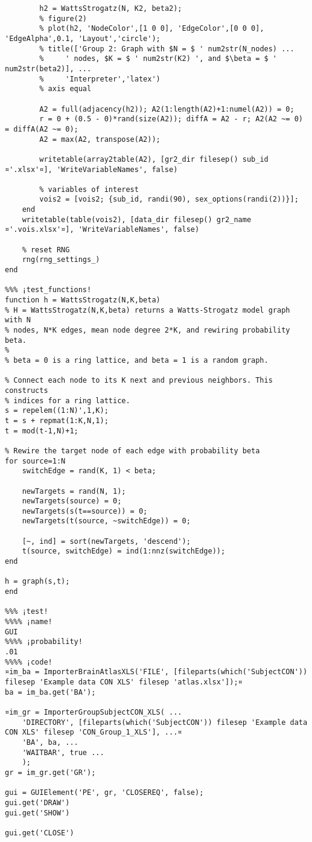 \documentclass{tufte-handout}
\begin{document}
\begin{lstlisting}
        h2 = WattsStrogatz(N, K2, beta2);
        % figure(2)
        % plot(h2, 'NodeColor',[1 0 0], 'EdgeColor',[0 0 0], 'EdgeAlpha',0.1, 'Layout','circle');
        % title(['Group 2: Graph with $N = $ ' num2str(N_nodes) ...
        %     ' nodes, $K = $ ' num2str(K2) ', and $\beta = $ ' num2str(beta2)], ...
        %     'Interpreter','latex')
        % axis equal

        A2 = full(adjacency(h2)); A2(1:length(A2)+1:numel(A2)) = 0;
        r = 0 + (0.5 - 0)*rand(size(A2)); diffA = A2 - r; A2(A2 ~= 0) = diffA(A2 ~= 0);
        A2 = max(A2, transpose(A2));

        writetable(array2table(A2), [gr2_dir filesep() sub_id ¤'.xlsx'¤], 'WriteVariableNames', false)

        % variables of interest
        vois2 = [vois2; {sub_id, randi(90), sex_options(randi(2))}];
    end
    writetable(table(vois2), [data_dir filesep() gr2_name ¤'.vois.xlsx'¤], 'WriteVariableNames', false)

    % reset RNG
    rng(rng_settings_)
end

%%% ¡test_functions!
function h = WattsStrogatz(N,K,beta)
% H = WattsStrogatz(N,K,beta) returns a Watts-Strogatz model graph with N
% nodes, N*K edges, mean node degree 2*K, and rewiring probability beta.
%
% beta = 0 is a ring lattice, and beta = 1 is a random graph.

% Connect each node to its K next and previous neighbors. This constructs
% indices for a ring lattice.
s = repelem((1:N)',1,K);
t = s + repmat(1:K,N,1);
t = mod(t-1,N)+1;

% Rewire the target node of each edge with probability beta
for source=1:N
    switchEdge = rand(K, 1) < beta;
    
    newTargets = rand(N, 1);
    newTargets(source) = 0;
    newTargets(s(t==source)) = 0;
    newTargets(t(source, ~switchEdge)) = 0;
    
    [~, ind] = sort(newTargets, 'descend');
    t(source, switchEdge) = ind(1:nnz(switchEdge));
end

h = graph(s,t);
end

%%% ¡test!
%%%% ¡name!
GUI
%%%% ¡probability!
.01
%%%% ¡code!
¤im_ba = ImporterBrainAtlasXLS('FILE', [fileparts(which('SubjectCON')) filesep 'Example data CON XLS' filesep 'atlas.xlsx']);¤
ba = im_ba.get('BA');

¤im_gr = ImporterGroupSubjectCON_XLS( ...
    'DIRECTORY', [fileparts(which('SubjectCON')) filesep 'Example data CON XLS' filesep 'CON_Group_1_XLS'], ...¤
    'BA', ba, ...
    'WAITBAR', true ...
    );
gr = im_gr.get('GR');

gui = GUIElement('PE', gr, 'CLOSEREQ', false);
gui.get('DRAW')
gui.get('SHOW')

gui.get('CLOSE')

\end{lstlisting}
\end{document}
